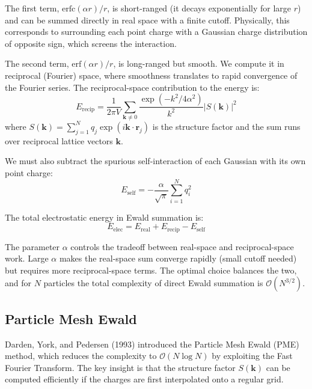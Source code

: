 The first term, $\text{erfc}(\alpha r)/r$, is short-ranged (it decays exponentially for large $r$) and can be summed directly in real space with a finite cutoff. Physically, this corresponds to surrounding each point charge with a Gaussian charge distribution of opposite sign, which screens the interaction.

The second term, $\text{erf}(\alpha r)/r$, is long-ranged but smooth. We compute it in reciprocal (Fourier) space, where smoothness translates to rapid convergence of the Fourier series. The reciprocal-space contribution to the energy is:
\begin{equation}
\label{eq:ewald-recip}
E_{\text{recip}} = \frac{1}{2\pi V} \sum_{\mathbf{k} \neq 0} \frac{\exp(-k^2/4\alpha^2)}{k^2} |S(\mathbf{k})|^2
\end{equation}
where $S(\mathbf{k}) = \sum_{j=1}^N q_j \exp(i\mathbf{k}\cdot\mathbf{r}_j)$ is the structure factor and the sum runs over reciprocal lattice vectors $\mathbf{k}$.

We must also subtract the spurious self-interaction of each Gaussian with its own point charge:
\begin{equation}
\label{eq:ewald-self}
E_{\text{self}} = -\frac{\alpha}{\sqrt{\pi}} \sum_{i=1}^N q_i^2
\end{equation}

The total electrostatic energy in Ewald summation is:
\begin{equation}
\label{eq:ewald-total}
E_{\text{elec}} = E_{\text{real}} + E_{\text{recip}} - E_{\text{self}}
\end{equation}

The parameter $\alpha$ controls the tradeoff between real-space and reciprocal-space work. Large $\alpha$ makes the real-space sum converge rapidly (small cutoff needed) but requires more reciprocal-space terms. The optimal choice balances the two, and for $N$ particles the total complexity of direct Ewald summation is $\mathcal{O}(N^{3/2})$.

\subsection{Particle Mesh Ewald}
\label{sec:pme}

Darden, York, and Pedersen (1993) introduced the Particle Mesh Ewald (PME) method, which reduces the complexity to $\mathcal{O}(N \log N)$ by exploiting the Fast Fourier Transform. The key insight is that the structure factor $S(\mathbf{k})$ can be computed efficiently if the charges are first interpolated onto a regular grid.


